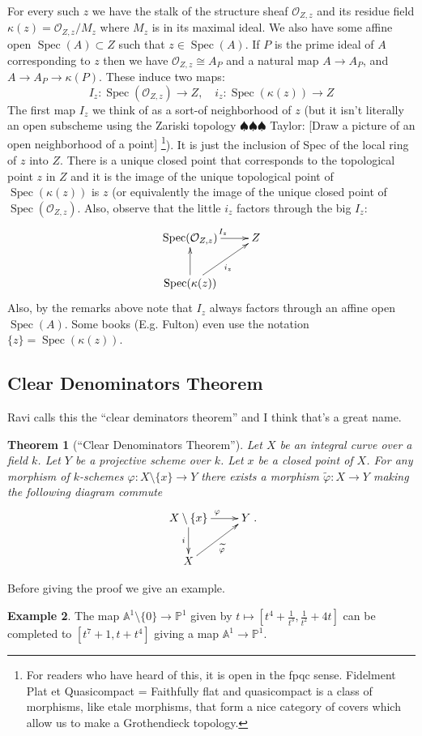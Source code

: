 \documentclass[12pt]{article}
\numberwithin{equation}{section}
\newtheorem{theorem}{Theorem}[subsection]
\theoremstyle{definition}
\newtheorem{example}[theorem]{Example}
\theoremstyle{remark}
\newcommand{\Ocal}{\mathcal{O}}
\newcommand{\PP}{\mathbb{P}}
\renewcommand{\AA}{\mathbb{A}}
\newcommand{\Spec}{\operatorname{Spec}}
\newcommand{\taylor}[1]{{\color{blue} \sf $\spadesuit\spadesuit\spadesuit$ Taylor: [#1]}}
\begin{document}
For every such $z$ we have the stalk of the structure sheaf $\Ocal_{Z,z}$ and its residue field $\kappa(z) = \Ocal_{Z,z}/M_z$ where $M_z$ is in its maximal ideal. 
We also have some affine open $\Spec(A) \subset Z$ such that $z \in \Spec(A)$. 
If $P$ is the prime ideal of $A$ corresponding to $z$ then we have $\Ocal_{Z,z}\cong A_{P}$ and a natural map $A\to A_P$, and $A\to A_P \to \kappa(P)$. 
These induce two maps:
$$ I_z: \Spec(\Ocal_{Z,z}) \to Z, \quad i_z: \Spec(\kappa(z)) \to Z$$
The first map $I_z$ we think of as a sort-of neighborhood of $z$ (but it isn't literally an open subscheme using the Zariski topology \taylor{Draw a picture of an open neighborhood of a point} \footnote{For readers who have heard of this, it is open in the fpqc sense. Fidelment Plat et Quasicompact = Faithfully flat and quasicompact is a class of morphisms, like etale morphisms, that form a nice category of covers which allow us to make a Grothendieck topology.}). 
It is just the inclusion of Spec of the local ring of $z$ into $Z$. 
There is a unique closed point that corresponds to the topological point $z$ in $Z$ and it is the image of the unique topological point of $\Spec(\kappa(z))$ is $z$ (or equivalently the image of the unique closed point of $\Spec(\Ocal_{Z,z})$. 
Also, observe that the little $i_z$ factors through the big $I_z$:
$$\xymatrix{
	\Spec(\Ocal_{Z,z}) \ar[r]^{I_z} & Z \\
	\Spec(\kappa(z))\ar[u] \ar[ur]_{i_z} & 
}$$
Also, by the remarks above note that $I_z$ always factors through an affine open $\Spec(A)$.
Some books (E.g. Fulton) even use the notation $\lbrace z \rbrace = \Spec(\kappa(z))$.

\subsection{Clear Denominators Theorem}
Ravi calls this the ``clear deminators theorem'' and I think that's a great name.  
\begin{theorem}[``Clear Denominators Theorem'']
	Let $X$ be an integral curve over a field $k$.
	Let $Y$ be a projective scheme over $k$.
	Let $x$ be a closed point of $X$.
	For any morphism of $k$-schemes $\varphi: X\setminus\lbrace x \rbrace \to Y$ there exists a morphism $\widetilde{\varphi}:X \to Y$ making the following diagram commute
	$$\xymatrix{
		X \setminus \lbrace x \rbrace \ar[r]^{\varphi} \ar[d]_{i} & Y\\
		X\ar[ur]_{\widetilde{\varphi}} & 
	}.$$
\end{theorem}
Before giving the proof we give an example. 
\begin{example}
	The map $\AA^1\setminus \lbrace 0 \rbrace \to \PP^1$ given by $t \mapsto [t^4+\frac{1}{t^3}, \frac{1}{t^2}+4t]$ can be completed to $[t^7+1, t+t^4]$ giving a map $\AA^1 \to \PP^1$.
\end{example}
\end{document}
